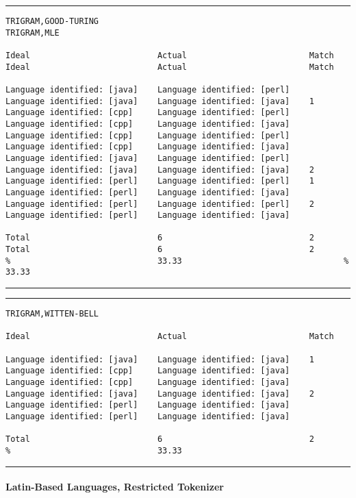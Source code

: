 \tiny
\hrule\vskip4pt
\begin{verbatim}
TRIGRAM,GOOD-TURING                                                  TRIGRAM,MLE

Ideal                          Actual                         Match  Ideal                          Actual                         Match

Language identified: [java]    Language identified: [perl]           Language identified: [java]    Language identified: [java]    1
Language identified: [cpp]     Language identified: [perl]           Language identified: [cpp]     Language identified: [java]
Language identified: [cpp]     Language identified: [perl]           Language identified: [cpp]     Language identified: [java]
Language identified: [java]    Language identified: [perl]           Language identified: [java]    Language identified: [java]    2
Language identified: [perl]    Language identified: [perl]    1      Language identified: [perl]    Language identified: [java]
Language identified: [perl]    Language identified: [perl]    2      Language identified: [perl]    Language identified: [java]

Total                          6                              2      Total                          6                              2
%                              33.33                                 %                              33.33
\end{verbatim}
\vskip4pt\hrule

\tiny
\hrule\vskip4pt
\begin{verbatim}
TRIGRAM,WITTEN-BELL

Ideal                          Actual                         Match

Language identified: [java]    Language identified: [java]    1
Language identified: [cpp]     Language identified: [java]
Language identified: [cpp]     Language identified: [java]
Language identified: [java]    Language identified: [java]    2
Language identified: [perl]    Language identified: [java]
Language identified: [perl]    Language identified: [java]

Total                          6                              2
%                              33.33
\end{verbatim}
\vskip4pt\hrule

\clearpage


\paragraph{Latin-Based Languages, Restricted Tokenizer}

